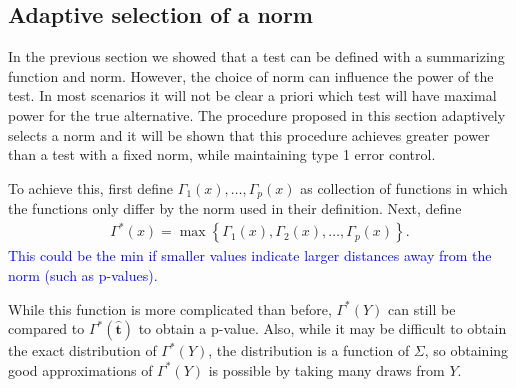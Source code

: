 \documentclass{article}
\newcommand{\vmat}{\Sigma}
\newcommand{\norm}{f}
\newcommand{\tst}{\hat{\boldsymbol{t}}}
\newcommand{\rvt}{Y}
\begin{document}
\subsection{Adaptive selection of a norm}
In the previous section we showed that a test can be defined with a summarizing function and norm. However, the choice of norm can influence the power of the test. In most scenarios it will not be clear a priori which test will have maximal power for the true alternative. The procedure proposed in this section adaptively selects a norm and it will be shown that this procedure achieves greater power than a test with a fixed norm, while maintaining type 1 error control.  

To achieve this, first define $\Gamma_{1}(x), \dots, \Gamma_{p}(x)$ as collection of functions in which the functions only differ by the norm used in their definition. Next, define
\begin{align*}
	\Gamma^*(x) = \max\left\{\Gamma_{1}(x), \Gamma_{2}(x), \dots, \Gamma_{p}(x)\right\}.
\end{align*}
\textcolor{blue}{This could be the min if smaller values indicate larger distances away from the norm (such as p-values).}  

While this function is more complicated than before,  $\Gamma^*(\rvt)$ can still be compared to $\Gamma^*(\tst)$ to obtain a p-value. Also, while it may be difficult to obtain the exact distribution of $\Gamma^*(\rvt)$, the distribution is a function of $\vmat$, so obtaining good approximations of $\Gamma^*(\rvt)$ is possible by taking many draws from $\rvt$.


\end{document}
